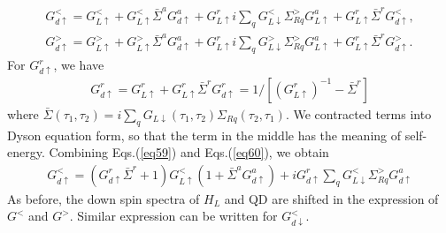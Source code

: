 \documentclass[aps,prb,superscriptaddress]{revtex4-2}
\begin{document}
\begin{gather}
G^<_{d\uparrow} =G^<_{L\uparrow} + G^<_{L\uparrow}{\bar \Sigma}^a G^a_{d\uparrow}
+G^r_{L\uparrow} i\sum_q G^<_{L\downarrow}\Sigma_{Rq}^> G^a_{L\uparrow} + G^r_{L\uparrow} {\bar \Sigma}^r G^<_{d\uparrow}, \label{eq59}\\
G^>_{d\uparrow} =G^>_{L\uparrow} + G^>_{L\uparrow}{\bar \Sigma}^a G^a_{d\uparrow}
+G^r_{L\uparrow} i\sum_q G^>_{L\downarrow}\Sigma_{Rq}^> G^a_{L\uparrow} + G^r_{L\uparrow} {\bar \Sigma}^r G^>_{d\uparrow}. \label{eq592}
\end{gather}
For $G^r_{d\uparrow}$, we have
\begin{eqnarray}
G^r_{d\uparrow} =G^r_{L\uparrow} + G^r_{L\uparrow} {\bar \Sigma}^r
G^r_{d\uparrow} = 1/[(G^r_{L\uparrow})^{-1} - {\bar \Sigma}^r]  \label{eq60}
\end{eqnarray}
where ${\bar \Sigma}(\tau_1,\tau_2) =i\sum_q G_{L\downarrow}(\tau_1,\tau_2)\Sigma_{Rq}(\tau_2,\tau_1)$. We contracted terms into Dyson equation form, so that the term in the middle has the meaning of self-energy. Combining Eqs.(\ref{eq59}) and Eqs.(\ref{eq60}), we obtain
\begin{eqnarray}
G^<_{d\uparrow} =(G^r_{d\uparrow}{\bar \Sigma}^r+1) G^<_{L\uparrow} (1+{\bar \Sigma}^a
G^a_{d\uparrow})
+i G^r_{d\uparrow} \sum_q G^<_{L\downarrow}\Sigma_{Rq}^> G^a_{d\uparrow} \nonumber
\end{eqnarray}
As before, the down spin spectra of $H_L$ and QD are shifted in the expression of $G^<$ and $G^>$. Similar expression can be written for $G^<_{d\downarrow}$. 
\end{document}
